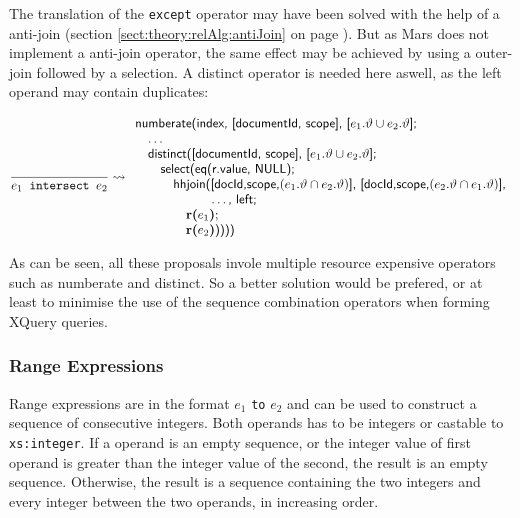 The translation of the \texttt{except} operator may have been solved with the help of a anti-join (section
\ref{sect:theory:relAlg:antiJoin} on page \pageref{sect:theory:relAlg:antiJoin}). But as Mars does not implement a
anti-join operator, the same effect may be achieved by using a outer-join followed by a selection. A
\textsf{distinct} operator is needed here aswell, as the left operand may contain duplicates:

\begin{equation*}
\frac{}{e_1 \mbox{\texttt{ intersect }} e_2} \leadsto
\begin{array}{l}
\mbox{\textsf{numberate(index, [documentId, scope], [}}e_1.\vartheta\cup e_2.\vartheta\mbox{\textsf{];}} \\ \quad
\mbox{\textsf{\ldots}} \\ \quad
\mbox{\textsf{distinct([documentId, scope], [}}e_1.\vartheta\cup e_2.\vartheta\mbox{\textsf{];}} \\ \quad\quad
\mbox{\textsf{select(eq(r.value, NULL);}} \\\quad\quad\quad
\mbox{\textsf{hhjoin([docId,scope,}}(e_1.\vartheta\cap e_2.\vartheta)\mbox{\textsf{],
[docId,scope,}}(e_2.\vartheta\cap e_1.\vartheta)\mbox{\textsf{],}}\\\quad\quad\quad\quad\quad\quad
\mbox{\textsf{\ldots, left;}} \\ \quad\quad \quad\quad 
\mbox{\textbf{r(}}e_1\mbox{\textbf{)};} \\ \quad\quad \quad\quad
\mbox{\textbf{r(}}e_2\mbox{\textbf{)}\textsf{))))}}
\end{array}
\end{equation*}

As can be seen, all these proposals invole multiple resource expensive operators such as \textsf{numberate} and
\textsf{distinct}. So a better solution would be prefered, or at least to minimise the use of the sequence
combination operators when forming XQuery queries.


\subsubsection{Range Expressions}
Range expressions are in the format $e_1$ \texttt{to} $e_2$ and can be used to construct a sequence of consecutive
integers. Both operands has to be integers or castable to \texttt{xs:integer}. If a operand is an empty
sequence, or the integer value of first operand is greater than the integer value of the second, the
result is an empty sequence. Otherwise, the result is a sequence containing the two integers and every
integer between the two operands, in increasing order.

